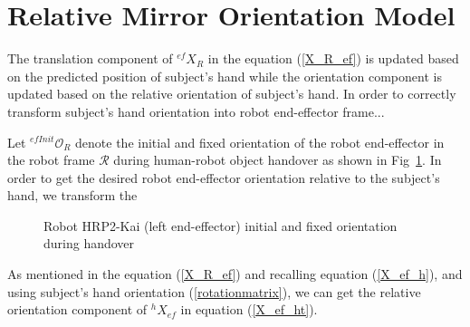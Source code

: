 \newpage
\section{Relative Mirror Orientation Model}\label{relOri}

The translation component of ${}^{ef}{X}_R $ in the equation (\ref{X_R_ef}) is updated based on the predicted position of subject's hand  while the orientation component is updated based on the relative orientation of subject's hand. In order to correctly transform subject's hand orientation into robot end-effector frame...

Let ${{}^{efInit}\mathcal{O}_R}$ denote the initial and fixed orientation of the robot end-effector in the robot frame $\mathcal{R}$ during human-robot object handover as shown in Fig~\ref{fig:robot_lt_empty_hand}. In order to get the desired robot end-effector orientation relative to the subject's hand, we transform the 



\begin{figure}[h]
	\caption{Robot HRP2-Kai (left end-effector) initial and fixed orientation during handover}
	\label{fig:robot_lt_empty_hand}
\end{figure}



As mentioned in the equation (\ref{X_R_ef}) and recalling equation (\ref{X_ef_h}), and using subject's hand orientation (\ref{rotationmatrix}), we can get the relative orientation component of ${}^{h}{X}_{ef}$ in equation (\ref{X_ef_ht}).





